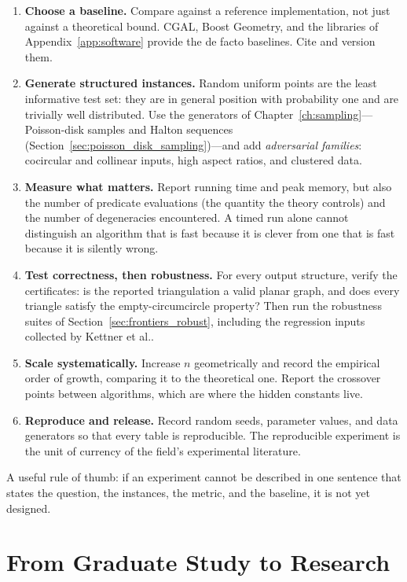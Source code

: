 \begin{enumerate}
\item \textbf{Choose a baseline.} Compare against a reference implementation,
  not just against a theoretical bound. CGAL, Boost Geometry, and the libraries
  of Appendix~\ref{app:software} provide the de facto baselines. Cite and
  version them.
\item \textbf{Generate structured instances.} Random uniform points are the
  least informative test set: they are in general position with probability one
  and are trivially well distributed. Use the generators of
  Chapter~\ref{ch:sampling}---Poisson-disk samples and Halton sequences
  (Section~\ref{sec:poisson_disk_sampling})---and add \emph{adversarial
  families}: cocircular and collinear inputs, high aspect ratios, and clustered
  data.
\item \textbf{Measure what matters.} Report running time and peak memory, but
  also the number of predicate evaluations (the quantity the theory controls)
  and the number of degeneracies encountered. A timed run alone cannot
  distinguish an algorithm that is fast because it is clever from one that is
  fast because it is silently wrong.
\item \textbf{Test correctness, then robustness.} For every output structure,
  verify the certificates: is the reported triangulation a valid planar graph,
  and does every triangle satisfy the empty-circumcircle property? Then run the
  robustness suites of Section~\ref{sec:frontiers_robust}, including the
  regression inputs collected by Kettner et al.\cite{kettner2008}.
\item \textbf{Scale systematically.} Increase $n$ geometrically and record the
  empirical order of growth, comparing it to the theoretical one. Report the
  crossover points between algorithms, which are where the hidden constants
  live.
\item \textbf{Reproduce and release.} Record random seeds, parameter values,
  and data generators so that every table is reproducible. The reproducible
  experiment is the unit of currency of the field's experimental literature.
\end{enumerate}

A useful rule of thumb: if an experiment cannot be described in one sentence
that states the question, the instances, the metric, and the baseline, it is
not yet designed.

\section{From Graduate Study to Research}
\label{sec:frontiers_graduate}

